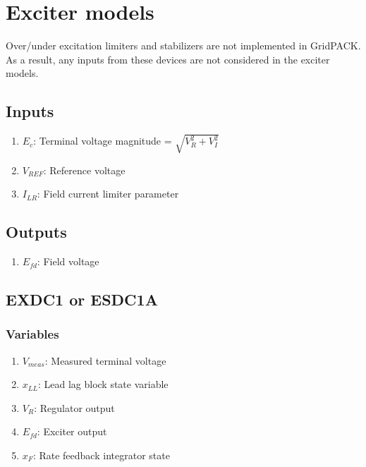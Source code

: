 \documentclass[12pt]{article}
\newcommand{\Vref}{V_{REF}}
\newcommand{\Efd}{E_{fd}}
\begin{document}
\section{Exciter models}
Over/under excitation limiters and stabilizers are not implemented in GridPACK. As a result, any inputs from these devices are not considered in the exciter models.

\subsection{Inputs}
\begin{enumerate}
  \item $E_c$: Terminal voltage magnitude = $\sqrt{V^{2}_R + V^{2}_I}$
  \item $\Vref$: Reference voltage
  \item $I_{LR}$: Field current limiter parameter
\end{enumerate}

\subsection{Outputs}
\begin{enumerate}
  \item $\Efd$: Field voltage
\end{enumerate}

\subsection{EXDC1 or ESDC1A \cite{PSSE}}

\subsubsection{Variables}
\begin{enumerate}
  \item $V_{meas}$: Measured terminal voltage
  \item $x_{LL}$: Lead lag block state variable
  \item $V_{R}$: Regulator output
  \item $\Efd$: Exciter output
  \item $x_F$: Rate feedback integrator state
\end{enumerate}
\end{document}
